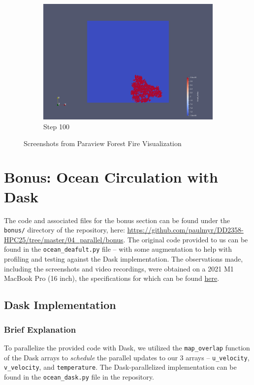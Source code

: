 \documentclass[a4paper,12pt]{article}
\begin{document}
\begin{figure}
\begin{subfigure}{0.4\textwidth}
    \includegraphics[width=\textwidth]{../images/vtk/ex1/step_100.png}
    \caption{Step 100}
\end{subfigure}
        
\caption{Screenshots from Paraview Forest Fire Visualization}
\end{figure}


\section{Bonus: Ocean Circulation with Dask}
The code and associated files for the bonus section can be found under the \verb|bonus/| directory of the repository, here: \url{https://github.com/paulmyr/DD2358-HPC25/tree/master/04_parallel/bonus}. The original code provided to us can be found in the \verb|ocean_deafult.py| file -- with some augmentation to help with profiling and testing against the Dask implementation. The observations made, including the screenshots and video recordings, were obtained on a 2021 M1 MacBook Pro (16 inch), the specifications for which can be found \href{https://support.apple.com/en-us/111901}{here}.

\subsection{Dask Implementation}

\subsubsection{Brief Explanation}
To parallelize the provided code with Dask, we utilized the \verb|map_overlap| function of the Dask arrays to \textit{schedule} the parallel updates to our 3 arrays -- \verb|u_velocity|, \verb|v_velocity|, and \verb|temperature|. The Dask-parallelized implementation can be found in the \verb|ocean_dask.py| file in the repository.
\end{document}
